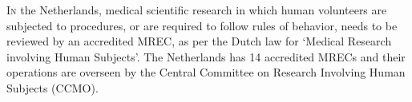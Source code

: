 \documentclass[authordate, meta]{jote-new-article}
\author[1]{\mbox{Sigrid E. M. Heinsbroek\orcid{0000-0003-0971-8599}}}
\affil[1]{METC NedMec}
\author[1]{\mbox{Vincent Bontrop\orcid{0000-0003-4009-0939}}}
\author[1]{\mbox{Rutger P. Chorus}}
\author[1]{\mbox{C. Michel Zwaan\orcid{0000-0001-6892-8268}}}
\begin{document}
\begin{frontmatter}
  \maketitle
  \begin{abstract}
    \printabstracttext
  \end{abstract}
\end{frontmatter}








\lettrine{I}{n} the Netherlands, medical scientific research in which human volunteers are subjected to procedures, or are required to follow rules of behavior, needs to be reviewed by an accredited MREC, as per the Dutch law for ‘Medical Research involving Human Subjects'. The Netherlands has 14 accredited MRECs and their operations are overseen by the Central Committee on Research Involving Human Subjects (CCMO).

\end{document}
